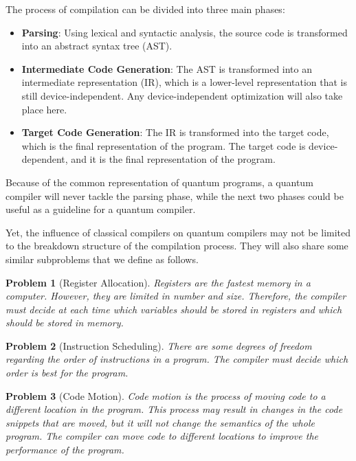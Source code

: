 \documentclass{report}
\newtheorem{problem}{Problem}
\begin{document}
The process of compilation can be divided into three main phases:

\begin{itemize}
  \item \textbf{Parsing}: Using lexical and syntactic analysis, the source code is transformed into an abstract syntax tree (AST).

  \item \textbf{Intermediate Code Generation}: The AST is transformed into an intermediate representation (IR), which is a lower-level representation that is still device-independent. Any device-independent optimization will also take place here.

  \item \textbf{Target Code Generation}: The IR is transformed into the target code, which is the final representation of the program. The target code is device-dependent, and it is the final representation of the program.
\end{itemize}

Because of the common representation of quantum programs, a quantum compiler will never tackle the parsing phase, while the next two phases could be useful as a guideline for a quantum compiler.

Yet, the influence of classical compilers on quantum compilers may not be limited to the breakdown structure of the compilation process. They will also share some similar subproblems that we define as follows.

\begin{problem}[Register Allocation]
  \label{prob:register_allocation}
  Registers are the fastest memory in a computer. However, they are limited in number and size. Therefore, the compiler must decide at each time which variables should be stored in registers and which should be stored in memory.~\cite[pp. 440-444]{allen2001}
\end{problem}

\begin{problem}[Instruction Scheduling]
  There are some degrees of freedom regarding the order of instructions in a program. The compiler must decide which order is best for the program.~\cite[chap. 10]{allen2001}
\end{problem}

\begin{problem}[Code Motion]
  Code motion is the process of moving code to a different location in the program. This process may result in changes in the code snippets that are moved, but it will not change the semantics of the whole program. The compiler can move code to different locations to improve the performance of the program.~\cite[p. 592]{aho1986}
\end{problem}
\end{document}
